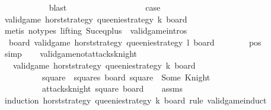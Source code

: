 \begin{isabellebody}
\ \ \ \ \ \ \ \ \ \ \isamarkupfalse%
\ blast\isanewline
\isanewline
\ \ \ \ \ \ \ \ \isamarkupfalse%
\isanewline
\isanewline
\ \ \ \ \ \ \ \ \isamarkupfalse%
\ {\isacharquery}case\isanewline
\ \ \ \ \ \ \ \ \ \ \isamarkupfalse%
\ {\isacartoucheopen}valid{\isacharunderscore}game\ {\isacharquery}horst{\isacharunderscore}strategy\ queenie{\isacharunderscore}strategy\ k\ board{\isacartoucheclose}\isanewline
\ \ \ \ \ \ \ \ \ \ \isamarkupfalse%
\ {\isacharparenleft}metis\ {\isacharparenleft}no{\isacharunderscore}types{\isacharcomma}\ lifting{\isacharparenright}\ Suc{\isacharunderscore}eq{\isacharunderscore}plus{}\ \ valid{\isacharunderscore}game{\isachardot}intros{\isacharparenleft}{}{\isacharparenright}{\isacharparenright}\isanewline
\ \ \ \ \ \ \isamarkupfalse%
\isanewline
\ \ \ \ \isamarkupfalse%
\isanewline
\ \ \ \ \isamarkupfalse%
\ {\isachardoublequoteopen}{\isasymexists}\ board{\isachardot}\ valid{\isacharunderscore}game\ {\isacharquery}horst{\isacharunderscore}strategy\ queenie{\isacharunderscore}strategy\ {\isacharquery}l\ board{\isachardoublequoteclose}\isanewline
\ \ \ \ \ \ \isamarkupfalse%
\ pos\isanewline
\ \ \ \ \ \ \isamarkupfalse%
\ simp\isanewline
\ \ \isamarkupfalse%
\isanewline
{}\isamarkupfalse%
%
\endisatagproof
{\isafoldproof}%
%
\isadelimproof
\isanewline
%
\endisadelimproof
\isanewline
{}\isamarkupfalse%
\ valid{\isacharunderscore}game{\isacharunderscore}not{\isacharunderscore}attacks{\isacharunderscore}knight{\isacharcolon}\isanewline
\ \ \ {\isachardoublequoteopen}valid{\isacharunderscore}game\ horst{\isacharunderscore}strategy\ queenie{\isacharunderscore}strategy\ k\ board{\isachardoublequoteclose}\isanewline
\ \ \ \ \ \ \ \ \ \ {\isachardoublequoteopen}square\ {\isasymin}\ squares{\isachardoublequoteclose}\ {\isachardoublequoteopen}board\ square\ {\isacharequal}\ Some\ Knight{\isachardoublequoteclose}\ \isanewline
\ \ \ \ \ \ \ \ \ {\isachardoublequoteopen}{\isasymnot}\ attacks{\isacharunderscore}knight\ square\ board{\isachardoublequoteclose}\isanewline
%
\isadelimproof
\ \ %
\endisadelimproof
%
\isatagproof
{}\isamarkupfalse%
\ assms\isanewline
{}\isamarkupfalse%
\ {\isacharparenleft}induction\ horst{\isacharunderscore}strategy\ queenie{\isacharunderscore}strategy\ k\ board\ rule{\isacharcolon}\ valid{\isacharunderscore}game{\isachardot}induct{\isacharparenright}\isanewline

\end{isabellebody}
